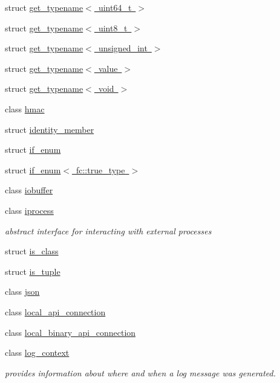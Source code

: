 \begin{DoxyCompactItemize}
\item 
struct \mbox{\hyperlink{structfc_1_1get__typename_3_01uint64__t_01_4}{get\+\_\+typename$<$ uint64\+\_\+t $>$}}
\item 
struct \mbox{\hyperlink{structfc_1_1get__typename_3_01uint8__t_01_4}{get\+\_\+typename$<$ uint8\+\_\+t $>$}}
\item 
struct \mbox{\hyperlink{structfc_1_1get__typename_3_01unsigned__int_01_4}{get\+\_\+typename$<$ unsigned\+\_\+int $>$}}
\item 
struct \mbox{\hyperlink{structfc_1_1get__typename_3_01value_01_4}{get\+\_\+typename$<$ value $>$}}
\item 
struct \mbox{\hyperlink{structfc_1_1get__typename_3_01void_01_4}{get\+\_\+typename$<$ void $>$}}
\item 
class \mbox{\hyperlink{classfc_1_1hmac}{hmac}}
\item 
struct \mbox{\hyperlink{structfc_1_1identity__member}{identity\+\_\+member}}
\item 
struct \mbox{\hyperlink{structfc_1_1if__enum}{if\+\_\+enum}}
\item 
struct \mbox{\hyperlink{structfc_1_1if__enum_3_01fc_1_1true__type_01_4}{if\+\_\+enum$<$ fc\+::true\+\_\+type $>$}}
\item 
class \mbox{\hyperlink{classfc_1_1iobuffer}{iobuffer}}
\item 
class \mbox{\hyperlink{classfc_1_1iprocess}{iprocess}}
\begin{DoxyCompactList}\small\item\em abstract interface for interacting with external processes \end{DoxyCompactList}\item 
struct \mbox{\hyperlink{structfc_1_1is__class}{is\+\_\+class}}
\item 
struct \mbox{\hyperlink{structfc_1_1is__tuple}{is\+\_\+tuple}}
\item 
class \mbox{\hyperlink{classfc_1_1json}{json}}
\item 
class \mbox{\hyperlink{classfc_1_1local__api__connection}{local\+\_\+api\+\_\+connection}}
\item 
class \mbox{\hyperlink{classfc_1_1local__binary__api__connection}{local\+\_\+binary\+\_\+api\+\_\+connection}}
\item 
class \mbox{\hyperlink{classfc_1_1log__context}{log\+\_\+context}}
\begin{DoxyCompactList}\small\item\em provides information about where and when a log message was generated. \end{DoxyCompactList}\item 

\end{DoxyCompactItemize}

